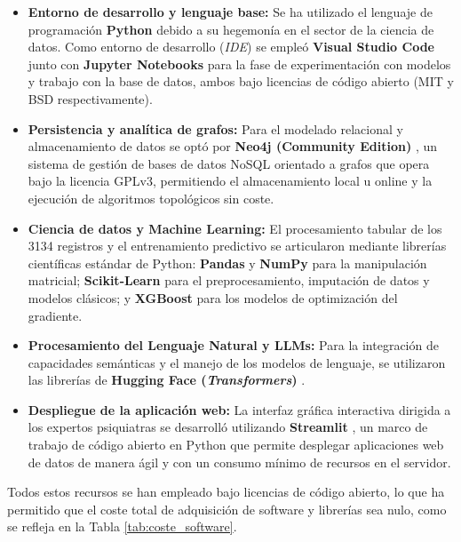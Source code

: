 \documentclass[12pt,a4paper,onecolumn,oneside]{report}
\begin{document}
\begin{itemize}
    \item \textbf{Entorno de desarrollo y lenguaje base:} Se ha utilizado el lenguaje de programación \textbf{Python} \cite{python} debido a su hegemonía en el sector de la ciencia de datos. Como entorno de desarrollo (\textit{IDE}) se empleó \textbf{Visual Studio Code} \cite{vscode} junto con \textbf{Jupyter Notebooks} \cite{jupyter} para la fase de experimentación con modelos y trabajo con la base de datos, ambos bajo licencias de código abierto (MIT y BSD respectivamente).
    \item \textbf{Persistencia y analítica de grafos:} Para el modelado relacional y almacenamiento de datos se optó por \textbf{Neo4j (Community Edition)} \cite{neo4j}, un sistema de gestión de bases de datos NoSQL orientado a grafos que opera bajo la licencia GPLv3, permitiendo el almacenamiento local u online y la ejecución de algoritmos topológicos sin coste.
    \item \textbf{Ciencia de datos y Machine Learning:} El procesamiento tabular de los 3134 registros y el entrenamiento predictivo se articularon mediante librerías científicas estándar de Python: \textbf{Pandas} \cite{pandas} y \textbf{NumPy} \cite{numpy} para la manipulación matricial; \textbf{Scikit-Learn} \cite{scikit-learn} para el preprocesamiento, imputación de datos y modelos clásicos; y \textbf{XGBoost} \cite{xgboost} para los modelos de optimización del gradiente.
    \item \textbf{Procesamiento del Lenguaje Natural y LLMs:} Para la integración de capacidades semánticas y el manejo de los modelos de lenguaje, se utilizaron las librerías de \textbf{Hugging Face (\textit{Transformers})} \cite{huggingface-transformers}.
    \item \textbf{Despliegue de la aplicación web:} La interfaz gráfica interactiva dirigida a los expertos psiquiatras se desarrolló utilizando \textbf{Streamlit} \cite{streamlit}, un marco de trabajo de código abierto en Python que permite desplegar aplicaciones web de datos de manera ágil y con un consumo mínimo de recursos en el servidor.
\end{itemize}

Todos estos recursos se han empleado bajo licencias de código abierto, lo que ha permitido que el coste total de adquisición de software y librerías sea nulo, como se refleja en la Tabla \ref{tab:coste_software}.
\end{document}
